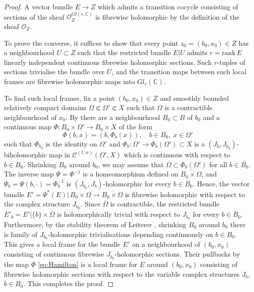 \documentclass[11pt]{amsart}
\numberwithin{equation}{section}
\theoremstyle{definition}
\newcommand\Cscr{\mathscr{C}}
\newcommand\Oscr{\mathscr{O}}
\newcommand\C{\mathbb{C}}
\begin{document}
\begin{proof}
A vector bundle $E\to Z$ which admits a transition cocycle 
consisting of sections of the sheaf $\Oscr_Z^{Gl(r,\C)}$ is 
fibrewise holomorphic by the definition of the sheaf $\Oscr_Z$.

To prove the converse, it suffices to show that every point $z_0=(b_0,x_0)\in Z$
has a neighbourhood $U\subset Z$ such that the restricted
bundle $E|U$ admits $r=\mathrm{rank}\, E$ linearly independent
continuous fibrewise holomorphic sections. Such $r$-tuples of 
sections trivialise the bundle over $U$, and the transition maps 
between such local frames are fibrewise holomorphic maps into $Gl_r(\C)$.

To find such local frames, fix a point $(b_0,x_0)\in Z$ and 
smoothly bounded relatively compact domains 
$\Omega\Subset \Omega'\Subset X$ such that $\Omega$ is a
contractible neighbourhood of $x_0$.
By \cite[Corollary 4.5]{Forstneric2024Runge} there are a neighbourhood 
$B_0\subset B$ of $b_0$ and a continuous map 
$\Phi:B_0\times \Omega'\to B_0\times X$ of the form 
\begin{equation}\label{eq:Hamilton}
	\Phi(b,x)=(b,\Phi_b(x)),\quad b\in B_0,\ x\in \Omega' 
\end{equation}
such that $\Phi_{b_0}$ is the identity on $\Omega'$ and 
$\Phi_b:\Omega'\to\Phi_b(\Omega')\subset X$ 
is a $(J_b,J_{b_0})$-biholomorphic 
map in $\Cscr^{(1,\alpha)}(\Omega',X)$ which is continuous 
with respect to $b\in B_0$. Shrinking $B_0$ around $b_0$, 
we may assume that $\overline \Omega \subset \Phi_b(\Omega')$
for all $b\in \overline{B_0}$. The inverse map $\Psi=\Phi^{-1}$ is a
homeomorphism defined on $\overline{B_0 \times  \Omega}$,
and $\Psi_b=\Psi(b,\cdotp)=\Phi_b^{-1}$ is $(J_{b_0},J_b)$-holomorphic 
for every $b\in \overline{B_0}$. Hence, the vector bundle 
$E'=\Psi^*(E)| \,\overline{B_0 \times  \Omega}\to \overline{B_0 \times  \Omega}$ is fibrewise
holomorphic with respect to the complex structure $J_{b_0}$.
Since $\overline \Omega$ is contractible, the restricted bundle
$E'_b=E'| \{b\}\times \overline\Omega$ is holomorphically trivial 
with respect to $J_{b_0}$ for every $b\in \overline B_0$. 
Furthermore, by the stability theorem
of Leiterer \cite[Theorem 2.7, p.\ 68]{Leiterer1990}, shrinking 
$B_0$ around $b_0$ there is family 
of $J_{b_0}$-holomorphic trivialisations depending continuously on 
$b\in B_0$. This gives a local frame for the bundle $E'$ on
a neighbourhood of $(b_0,x_0)$
consisting of continuous fibrewise $J_{b_0}$-holomorphic sections. 
Their pullbacks by the map $\Phi$ \eqref{eq:Hamilton} is a 
local frame for $E$ around $(b_0,x_0)$ consisting of fibrewise 
holomorphic sections with respect to the variable complex
structures $J_b$, $b\in B_0$. This completes the proof.
\end{proof}
\end{document}
